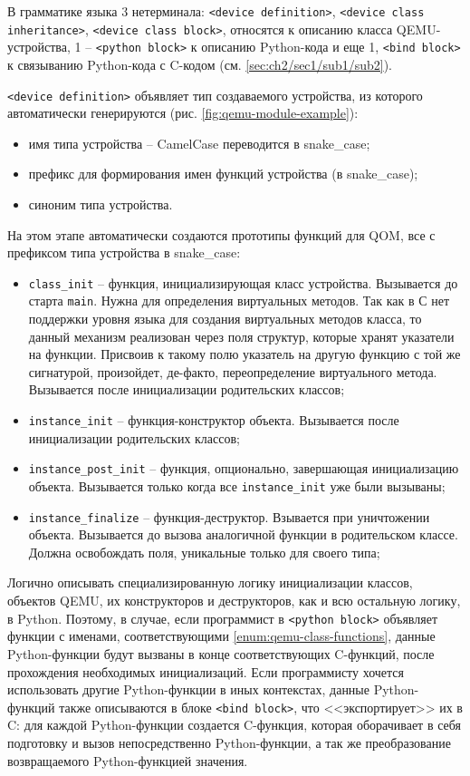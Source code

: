 В грамматике языка {\mylanguage} 3 нетерминала:
\texttt{<device definition>}, \texttt{<device class inheritance>}, \texttt{<device class block>},
относятся к описанию класса QEMU-устройства, 1 -- \texttt{<python block>} к описанию Python-кода
и еще 1, \texttt{<bind block>} к связыванию Python-кода с C-кодом (см. \ref{sec:ch2/sec1/sub1/sub2}).

\texttt{<device definition>} объявляет тип создаваемого устройства, из которого автоматически
генерируются (рис. \ref{fig:qemu-module-example}):
\begin{itemize}
    \item имя типа устройства -- CamelCase переводится в snake\_case;
    \item префикс для формирования имен функций устройства (в snake\_case);
    \item синоним типа устройства.
\end{itemize}

На этом этапе автоматически создаются прототипы функций для QOM, все
с префиксом типа устройства в snake\_case:
\begin{itemize}
    \item \texttt{class\_init} -- функция, инициализирующая класс устройства.
        Вызывается до старта \texttt{main}. Нужна для определения виртуальных методов.
        Так как в С нет поддержки уровня языка для создания виртуальных методов
        класса, то данный механизм реализован через поля структур, которые хранят
        указатели на функции. Присвоив к такому полю указатель на другую функцию
        с той же сигнатурой, произойдет, де-факто, переопределение виртуального метода.
        Вызывается после инициализации родительских классов;
    \item \texttt{instance\_init} -- функция-конструктор объекта. Вызывается после
        инициализации родительских классов;
    \item \texttt{instance\_post\_init} -- функция, опционально, завершающая инициализацию
        объекта. Вызывается только когда все \texttt{instance\_init} уже были вызываны;
    \item \texttt{instance\_finalize} -- функция-деструктор. Взывается при уничтожении
        объекта. Вызывается до вызова аналогичной функции в родительском классе.
        Должна освобождать поля, уникальные только для своего типа;
\end{itemize}\label{enum:qemu-class-functions}

Логично описывать специализированную логику инициализации классов,
объектов QEMU, их конструкторов и деструкторов, как и всю остальную логику, в Python.
Поэтому, в случае, если программист в \texttt{<python block>} объявляет функции с именами,
соответствующими \ref{enum:qemu-class-functions}, данные Python-функции будут вызваны
в конце соответствующих C-функций, после прохождения необходимых инициализаций.
Если программисту хочется использовать другие Python-функции в иных контекстах,
данные Python-функций также описываются в блоке \texttt{<bind block>},
что <<экспортирует>> их в C: для каждой Python-функции создается C-функция,
которая оборачивает в себя подготовку и вызов непосредственно Python-функции, а так же
преобразование возвращаемого Python-функцией значения.


